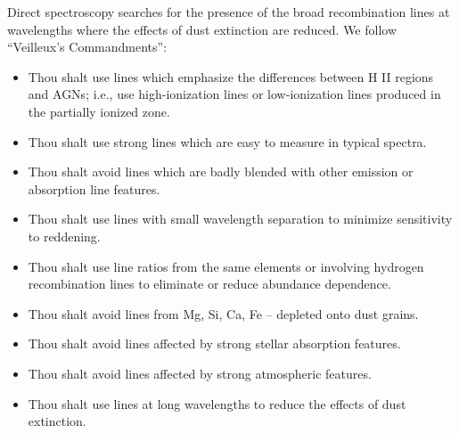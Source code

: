 Direct spectroscopy searches for the presence of the broad recombination lines at wavelengths where the effects of dust extinction are reduced.
We follow ``Veilleux's Commandments'':
\begin{itemize}
\item Thou shalt use lines which emphasize the differences between H II regions and AGNs; i.e., use high-ionization lines or low-ionization lines produced in the partially ionized zone. 
\item Thou shalt use strong lines which are easy to measure in typical spectra.
\item Thou shalt avoid lines which are badly blended with other emission or absorption line features.
\item Thou shalt use lines with small wavelength separation to minimize sensitivity to reddening.
\item Thou shalt use line ratios from the same elements or involving hydrogen recombination lines to eliminate or reduce abundance dependence.
\item Thou shalt avoid lines from Mg, Si, Ca, Fe – depleted onto dust grains. 
\item Thou shalt avoid lines affected by strong stellar absorption features. 
\item Thou shalt avoid lines affected by strong atmospheric features.
\item Thou shalt use lines at long wavelengths to reduce the effects of dust extinction.
\end{itemize}


